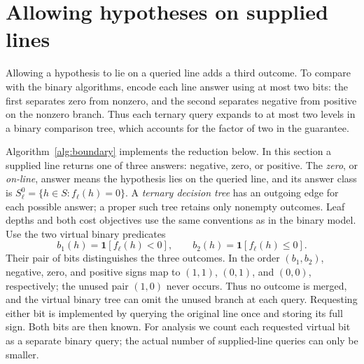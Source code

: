 \section{Allowing hypotheses on supplied lines}
\label{sec:boundaries}

Allowing a hypothesis to lie on a queried line adds a third outcome.
To compare with the binary algorithms, encode each line answer using
at most two bits: the first separates zero from nonzero, and the
second separates negative from positive on the nonzero branch. Thus
each ternary query expands to at most two levels in a binary comparison
tree, which accounts for the factor of two in the guarantee.

Algorithm~\ref{alg:boundary} implements the reduction below.
In this section a supplied line returns one of three answers:
negative, zero, or positive. The \emph{zero}, or \emph{on-line},
answer means the hypothesis lies on the queried line, and its
answer class is $S_\ell^0=\{h\in S:f_\ell(h)=0\}$.
A \emph{ternary decision tree} has an outgoing edge for each
possible answer; a proper such tree retains only nonempty outcomes.
Leaf depths and both cost objectives use the same conventions as in
the binary model.
Use the two virtual binary predicates
\[
 b_1(h)=\mathbf1[f_\ell(h)<0],\qquad
 b_2(h)=\mathbf1[f_\ell(h)\le0].
\]
Their pair of bits distinguishes the three outcomes.
In the order $(b_1,b_2)$, negative, zero, and positive signs map to
$(1,1)$, $(0,1)$, and $(0,0)$, respectively; the unused pair $(1,0)$
never occurs. Thus no outcome is merged, and the virtual binary tree
can omit the unused branch at each query.
Requesting either bit is implemented by querying the original line
once and storing its full sign. Both bits are then known. For analysis
we count each requested virtual bit as a separate binary query;
the actual number of supplied-line queries can only be smaller.

